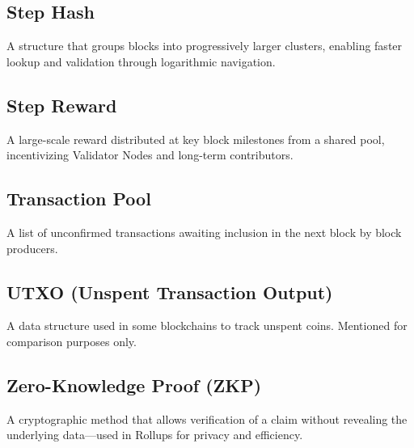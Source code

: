 \documentclass{article}
\begin{document}
\subsection*{Step Hash}
A structure that groups blocks into progressively larger clusters, enabling faster lookup and validation through logarithmic navigation.

\subsection*{Step Reward}
A large-scale reward distributed at key block milestones from a shared pool, incentivizing Validator Nodes and long-term contributors.

\subsection*{Transaction Pool}
A list of unconfirmed transactions awaiting inclusion in the next block by block producers.

\subsection*{UTXO (Unspent Transaction Output)}
A data structure used in some blockchains to track unspent coins. Mentioned for comparison purposes only.

\subsection*{Zero-Knowledge Proof (ZKP)}
A cryptographic method that allows verification of a claim without revealing the underlying data—used in Rollups for privacy and efficiency.
\end{document}
